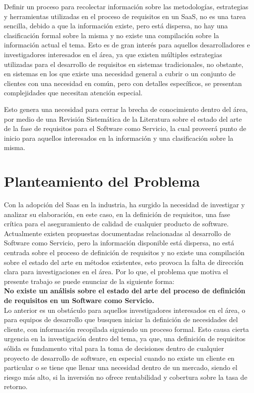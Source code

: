 \documentclass{article}
\begin{document}
Definir un proceso para recolectar información sobre las metodologías, estrategias y herramientas utilizadas en el proceso de requisitos en un SaaS, no es una tarea sencilla, debido a que la información existe, 
pero está dispersa, no hay una clasificación formal sobre la misma y no existe una compilación sobre la información actual el tema. Esto es de gran interés para aquellos desarrolladores e investigadores interesados 
en el área, ya que existen múltiples estrategias utilizadas para el desarrollo de requisitos en sistemas tradicionales, no obstante, en sistemas en los que existe una necesidad general a cubrir o un conjunto de 
clientes con una necesidad en común, pero con detalles específicos, se presentan complejidades que necesitan atención especial. 
 
Esto genera una necesidad para cerrar la brecha de conocimiento dentro del área, por medio de una Revisión Sistemática de la Literatura sobre el estado del arte de la fase de requisitos para el Software como Servicio, la 
cual proveerá punto de inicio para aquellos interesados en la información y una clasificación sobre la misma.
\newpage

\section{Planteamiento del Problema}
Con la adopción del Saas en la industria, ha surgido la necesidad de investigar y analizar su elaboración, en este caso, en la definición de requisitos, una fase crítica para el aseguramiento de calidad de cualquier 
producto de software. Actualmente existen propuestas documentadas relacionadas al desarrollo de Software como Servicio, pero la información disponible está dispersa, no está centrada sobre el proceso de 
definición de requisitos y no existe una compilación sobre el estado del arte en métodos existentes, esto provoca la falta de dirección clara para investigaciones en el área. Por lo que, el problema que 
motiva el presente trabajo se puede enunciar de la siguiente forma:\\

\textbf{No existe un análisis sobre el estado del arte del proceso de definición de requisitos en un Software como Servicio.}\\

Lo anterior es un obstáculo para aquellos investigadores interesados en el área, o para equipos de desarrollo que busquen iniciar la definición de necesidades del cliente, con información recopilada siguiendo un proceso formal. 
Esto causa cierta urgencia en la investigación dentro del tema, ya que, una definición de requisitos sólida es fundamento vital para la toma de decisiones dentro de cualquier proyecto de desarrollo de software, 
en especial cuando no existe un cliente en particular o se tiene que llenar una necesidad dentro de un mercado, siendo el riesgo más alto, si la inversión no ofrece rentabilidad y cobertura sobre la tasa de retorno. 
\end{document}
